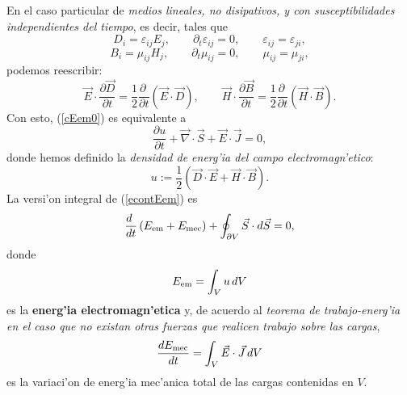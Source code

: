 En el caso particular de \textit{medios lineales, no disipativos, y con susceptibilidades
independientes del tiempo}, es decir, tales que
\begin{equation}
D_i=\varepsilon_{ij}E_j, \qquad \partial_t\varepsilon_{ij}=0, \qquad \varepsilon_{ij}=\varepsilon_{ji},
\end{equation}
\begin{equation}
B_i=\mu_{ij}H_j, \qquad \partial_t\mu_{ij}=0, \qquad \mu_{ij}=\mu_{ji},
\end{equation}
podemos reescribir:
\begin{equation}
 \vec{E}\cdot\frac{\partial \vec{D}}{\partial
t}=\frac{1}{2}\frac{\partial\ }{\partial t}\left(\vec{E}\cdot\vec{D}\right),
\qquad
 \vec{H}\cdot\frac{\partial \vec{B}}{\partial
t}=\frac{1}{2}\frac{\partial\ }{\partial t}\left(\vec{H}\cdot\vec{B}\right).
\end{equation}
Con esto, (\ref{cEem0}) es equivalente a
\begin{equation}
\boxed{\frac{\partial u}{\partial
t}+\vec\nabla\cdot\vec{S}+\vec{E}\cdot\vec{J}=0 ,} \label{econtEem}
\end{equation}
donde hemos definido la \textit{densidad de energ'ia del campo
electromagn'etico}:
\begin{equation}\label{uDEHB}
\boxed{u:=\frac{1}{2}\left(\vec{D}\cdot\vec{E}+\vec{H}\cdot\vec{B}\right).}
\end{equation}
La versi'on integral de (\ref{econtEem}) es
\begin{equation}
\frac{d\ }{dt}\left(E_{\rm em}+E_{\rm mec}\right)+\oint_{\partial
V}\vec{S}\cdot d\vec{S}=0 ,
\end{equation}
donde
\begin{equation}
E_{\rm em}=\int_V u\,dV
\end{equation}
es la \textbf{energ'ia electromagn'etica} y, de acuerdo al \textit{teorema de trabajo-energ'ia} \textit{en el caso que no existan otras fuerzas que realicen trabajo sobre las cargas},
\begin{equation}
 \frac{dE_{\rm mec}}{dt}=\int_V\vec{E}\cdot\vec{J}\,dV
\end{equation}
es la variaci'on de energ'ia mec'anica total de las cargas contenidas en $V$.

